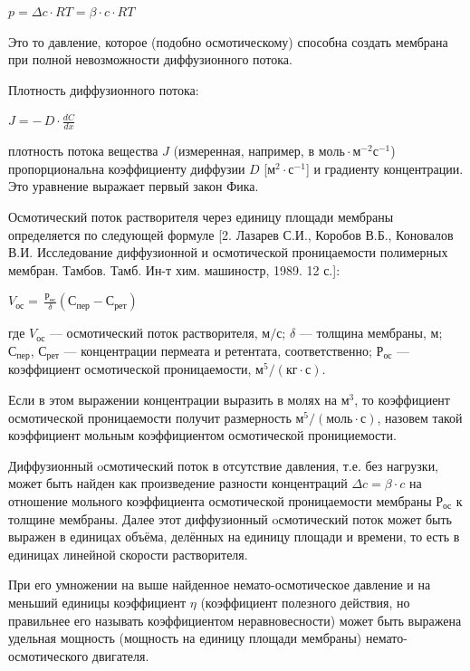 \documentclass[11pt]{article}
\begin{document}
\(p = \Delta c \cdot RT = \beta \cdot c \cdot RT\)

Это то давление, которое (подобно осмотическому) способна создать
мембрана при полной невозможности диффузионного потока.



    Плотность диффузионного потока:

\(J = -\,D \cdot \frac{dC}{dx}\)

плотность потока вещества \({\displaystyle J}\) (измеренная, например, в
\(моль \cdot м^{-2} с^{-1}\)) пропорциональна коэффициенту диффузии
\({\displaystyle D}\) {[}\(м^2·с^{-1}\){]} и градиенту концентрации. Это
уравнение выражает первый закон Фика.



    Осмотический поток растворителя через единицу площади мембраны
определяется по следующей формуле {[}2. Лазарев С.И., Коробов В.Б.,
Коновалов В.И. Исследование диффузионной и осмотической проницаемости
полимерных мембран. Тамбов. Тамб. Ин-т хим. машиностр, 1989. 12 с.{]}:

\(V_{ос} =\,\frac{Р_{ос}}{\delta}\left(С_{пер}-С_{рет}\right)\)

где \(V_{ос}\) --- осмотический поток растворителя, \(м/с\); \(\delta\)
--- толщина мембраны, \(м\); \(С_{пер}\), \(С_{рет}\) --- концентрации
пермеата и ретентата, соответственно; \(Р_{ос}\) --- коэффициент
осмотической проницаемости, \(м^5/\left(кг \cdot с\right)\).

Если в этом выражении концентрации выразить в молях на \(м^3\), то
коэффициент осмотической проницаемости получит размерность
\(м^5/\left(моль \cdot с\right)\), назовем такой коэффициент мольным
коэффициентом осмотической пронициемости.



    Диффузионный oсмотический поток в отсутствие давления, т.е. без
нагрузки, может быть найден как произведение разности концентраций
\(\Delta c = \beta \cdot c\) на отношение мольного коэффициента
осмотической проницаемости мембраны \(Р_{ос}\) к толщине мембраны. Далее
этот диффузионный oсмотический поток может быть выражен в единицах
объёма, делённых на единицу площади и времени, то есть в единицах
линейной скорости растворителя.

При его умножении на выше найденное немато-осмотическое давление и на
меньший единицы коэффициент \(\eta\) (коэффициент полезного действия, но
правильнее его называть коэффициентом неравновесности) может быть
выражена удельная мощность (мощность на единицу площади мембраны)
немато-осмотического двигателя.
\end{document}
